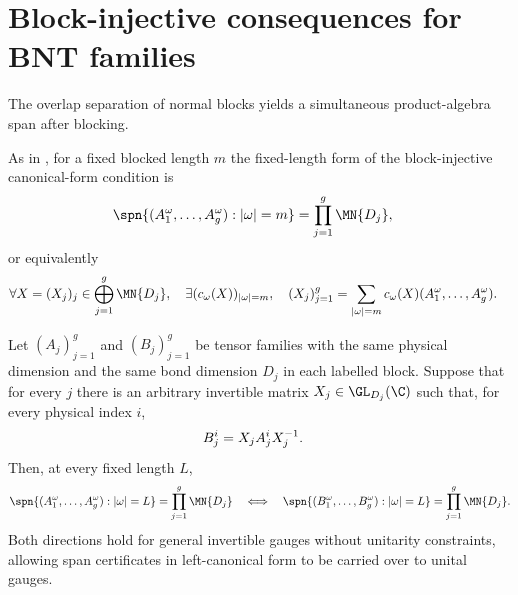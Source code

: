 \section{Block-injective consequences for BNT families}

The overlap separation of normal blocks yields a simultaneous product-algebra
span after blocking.

\begin{definition}
    \label{def:blockwise_product_word_span}
    \leanok
    As in \cite[lines~2113--2117]{Cirac2021Matrix}, for a fixed blocked
    length $m$ the fixed-length form of the block-injective canonical-form
    condition is
    \begin{align}
        \spn\{(A_1^\omega,\ldots,A_g^\omega):|\omega|=m\}
         & =
        \prod_{j=1}^g \MN{D_j},
        \notag
    \end{align}
    or equivalently
    \begin{align}
        \forall X=(X_j)_j\in\bigoplus_{j=1}^g \MN{D_j},
        \quad
        \exists (c_\omega(X))_{|\omega|=m},
        \quad
        (X_j)_{j=1}^g
         & =
        \sum_{|\omega|=m} c_\omega(X)
        (A_1^\omega,\ldots,A_g^\omega).
        \notag
    \end{align}
\end{definition}

\begin{lemma}
    \label{thm:word_tuple_span_gauge_invariance}
    \leanok
    Let $(A_j)_{j=1}^g$ and $(B_j)_{j=1}^g$ be tensor families with the same
    physical dimension and the same bond dimension $D_j$ in each labelled
    block. Suppose that for every $j$ there is an arbitrary invertible matrix
    $X_j\in\GL_{D_j}(\C)$ such that, for every physical index $i$,
    \begin{align}
        B_j^i & =X_jA_j^iX_j^{-1}.
        \notag
    \end{align}
    Then, at every fixed length $L$,
    \begin{align}
        \spn\{(A_1^\omega,\ldots,A_g^\omega):|\omega|=L\}
        =\prod_{j=1}^g\MN{D_j}
        \quad\Longleftrightarrow\quad
        \spn\{(B_1^\omega,\ldots,B_g^\omega):|\omega|=L\}
        =\prod_{j=1}^g\MN{D_j}.
        \notag
    \end{align}
    Both directions hold for general invertible gauges without unitarity
    constraints, allowing span certificates in left-canonical form to be
    carried over to unital gauges.
\end{lemma}

